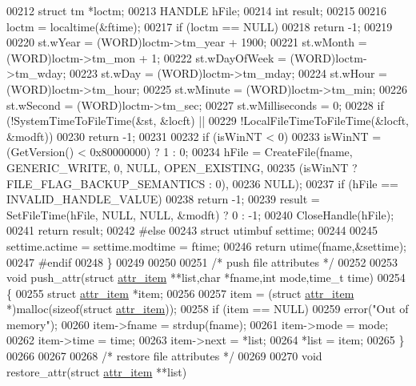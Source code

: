\begin{DoxyCode}
{{{00212   \textcolor{keyword}{struct }tm *loctm;
00213   HANDLE hFile;
00214   \textcolor{keywordtype}{int} result;
00215 
00216   loctm = localtime(&ftime);
00217   \textcolor{keywordflow}{if} (loctm == NULL)
00218     \textcolor{keywordflow}{return} -1;
00219 
00220   st.wYear         = (WORD)loctm->tm\_year + 1900;
00221   st.wMonth        = (WORD)loctm->tm\_mon + 1;
00222   st.wDayOfWeek    = (WORD)loctm->tm\_wday;
00223   st.wDay          = (WORD)loctm->tm\_mday;
00224   st.wHour         = (WORD)loctm->tm\_hour;
00225   st.wMinute       = (WORD)loctm->tm\_min;
00226   st.wSecond       = (WORD)loctm->tm\_sec;
00227   st.wMilliseconds = 0;
00228   if (!SystemTimeToFileTime(&st, &locft) ||
00229       !LocalFileTimeToFileTime(&locft, &modft))
00230     \textcolor{keywordflow}{return} -1;
00231 
00232   \textcolor{keywordflow}{if} (isWinNT < 0)
00233     isWinNT = (GetVersion() < 0x80000000) ? 1 : 0;
00234   hFile = CreateFile(fname, GENERIC\_WRITE, 0, NULL, OPEN\_EXISTING,
00235                      (isWinNT ? FILE\_FLAG\_BACKUP\_SEMANTICS : 0),
00236                      NULL);
00237   \textcolor{keywordflow}{if} (hFile == INVALID\_HANDLE\_VALUE)
00238     \textcolor{keywordflow}{return} -1;
00239   result = SetFileTime(hFile, NULL, NULL, &modft) ? 0 : -1;
00240   CloseHandle(hFile);
00241   \textcolor{keywordflow}{return} result;
00242 \textcolor{preprocessor}{#else}
00243   \textcolor{keyword}{struct }utimbuf settime;
00244 
00245   settime.actime = settime.modtime = ftime;
00246   \textcolor{keywordflow}{return} utime(fname,&settime);
00247 \textcolor{preprocessor}{#endif}
00248 \}
00249 
00250 
00251 \textcolor{comment}{/* push file attributes */}
00252 
00253 \textcolor{keywordtype}{void} push\_attr(\textcolor{keyword}{struct} \hyperlink{structattr__item}{attr\_item} **list,\textcolor{keywordtype}{char} *fname,\textcolor{keywordtype}{int} mode,time\_t time)
00254 \{
00255   \textcolor{keyword}{struct }\hyperlink{structattr__item}{attr\_item} *item;
00256 
00257   item = (\textcolor{keyword}{struct }\hyperlink{structattr__item}{attr\_item} *)malloc(\textcolor{keyword}{sizeof}(\textcolor{keyword}{struct} \hyperlink{structattr__item}{attr\_item}));
00258   \textcolor{keywordflow}{if} (item == NULL)
00259     error(\textcolor{stringliteral}{"Out of memory"});
00260   item->fname = strdup(fname);
00261   item->mode  = mode;
00262   item->time  = time;
00263   item->next  = *list;
00264   *list       = item;
00265 \}
00266 
00267 
00268 \textcolor{comment}{/* restore file attributes */}
00269 
00270 \textcolor{keywordtype}{void} restore\_attr(\textcolor{keyword}{struct} \hyperlink{structattr__item}{attr\_item} **list)
}}}
\end{DoxyCode}
